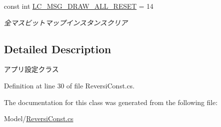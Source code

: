 \begin{DoxyCompactItemize}
\mbox{\label{class_reversi_wpf_1_1_reversi_const_a7b8ae4458d687d9c801d976e3453a6da}} 
const int \hyperlink{class_reversi_wpf_1_1_reversi_const_a7b8ae4458d687d9c801d976e3453a6da}{L\+C\+\_\+\+M\+S\+G\+\_\+\+D\+R\+A\+W\+\_\+\+A\+L\+L\+\_\+\+R\+E\+S\+ET} = 14
\begin{DoxyCompactList}\small\item\em 全マスビットマップインスタンスクリア \end{DoxyCompactList}\end{DoxyCompactItemize}


\subsection{Detailed Description}
アプリ設定クラス 

Definition at line 30 of file Reversi\+Const.\+cs.



The documentation for this class was generated from the following file\+:\begin{DoxyCompactItemize}
\item 
Model/\hyperlink{_reversi_const_8cs}{Reversi\+Const.\+cs}\end{DoxyCompactItemize}
